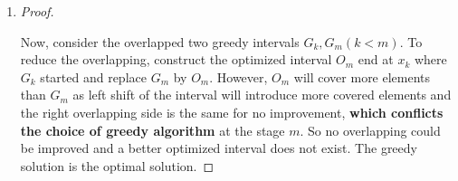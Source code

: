 \documentclass[12pt,a4paper]{article}
\makeatletter
\newtheorem*{solution}{Solution}
\theoremstyle{definition}
\renewenvironment{solution}[1][Solution] {\par\pushQED{\qed}\normalfont\topsep6\p@\@plus6\p@\relax\trivlist\item[\hskip\labelsep\bfseries#1\@addpunct{.}]\ignorespaces}{\popQED\endtrivlist\@endpefalse} \makeatother
\makeatother
\begin{document}
\begin{enumerate}
\begin{solution}
\begin{enumerate}
\begin{proof}
		   \begin{figure}[H]
			   \centering
			   
		   \end{figure}

		   Now, consider the overlapped two greedy intervals $G_k,G_m(k<m)$. To reduce the overlapping, construct the optimized interval $O_m$ end at $x_k$ where $G_k$ started and replace $G_m$ by $O_m$. However, $O_m$ will cover more elements than $G_m$ as left shift of the interval will introduce more covered elements and the right overlapping side is the same for no improvement, \textbf{which conflicts the choice of greedy algorithm} at the stage $m$. So no overlapping could be improved and a better optimized interval does not exist. The greedy solution is the optimal solution. 
		\end{proof}

		   

		   

\end{enumerate}
\end{solution}
\end{enumerate}
\end{document}
